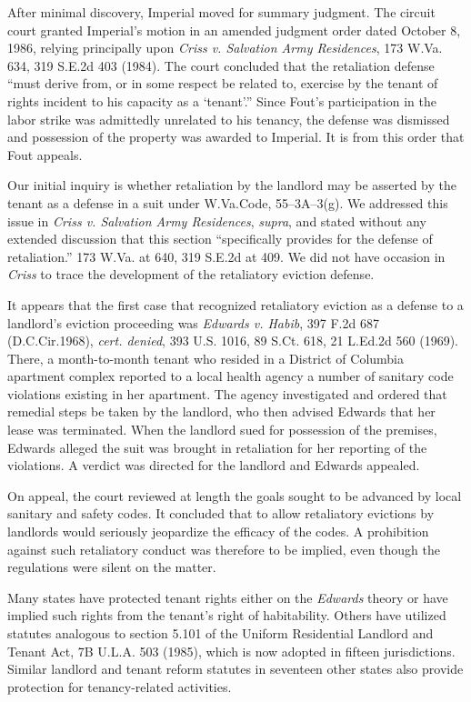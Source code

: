 After minimal discovery, Imperial moved for summary judgment. The circuit court
granted Imperial's motion in an amended judgment order dated October 8, 1986,
relying principally upon \textit{Criss v. Salvation Army Residences}, 173 W.Va.
634, 319 S.E.2d 403 (1984). The court concluded that the retaliation defense
``must derive from, or in some respect be related to, exercise by the tenant of
rights incident to his capacity as a `tenant'.'' Since Fout's participation in
the labor strike was admittedly unrelated to his tenancy, the defense was
dismissed and possession of the property was awarded to Imperial. It is from
this order that Fout appeals.

Our initial inquiry is whether retaliation by the landlord may be asserted by
the tenant as a defense in a suit under W.Va.Code, 55--3A--3(g). We addressed
this issue in \textit{Criss v. Salvation Army Residences}, \textit{supra}, and
stated without any extended discussion that this section ``specifically
provides for the defense of retaliation.'' 173 W.Va. at 640, 319 S.E.2d at 409.
We did not have occasion in \textit{Criss} to trace the development of the
retaliatory eviction defense.

It appears that the first case that recognized retaliatory eviction as a defense
to a landlord's eviction proceeding was \textit{Edwards v. Habib}, 397 F.2d 687
(D.C.Cir.1968), \textit{cert. denied}, 393 U.S. 1016, 89 S.Ct. 618, 21 L.Ed.2d
560 (1969). There, a month-to-month tenant who resided in a District of
Columbia apartment complex reported to a local health agency a number of
sanitary code violations existing in her apartment. The agency investigated and
ordered that remedial steps be taken by the landlord, who then advised Edwards
that her lease was terminated. When the landlord sued for possession of the
premises, Edwards alleged the suit was brought in retaliation for her reporting
of the violations. A verdict was directed for the landlord and Edwards
appealed.

On appeal, the court reviewed at length the goals sought to be advanced by local
sanitary and safety codes. It concluded that to allow retaliatory evictions by
landlords would seriously jeopardize the efficacy of the codes. A prohibition
against such retaliatory conduct was therefore to be implied, even though the
regulations were silent on the matter.

Many states have protected tenant rights either on the \textit{Edwards} theory
or have implied such rights from the tenant's right of habitability. Others
have utilized statutes analogous to section 5.101 of the Uniform Residential
Landlord and Tenant Act, 7B U.L.A. 503 (1985), which is now adopted in fifteen
jurisdictions. Similar landlord and tenant reform statutes in seventeen other
states also provide protection for tenancy-related activities.

